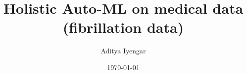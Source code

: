     \title{Holistic Auto-ML on medical data (fibrillation data) }

    \author{Aditya Iyengar}

    \date{\today}

    \newcommand{\examinerA}{Prof. Dr. Andreas Dengel}
    \newcommand{\examinerB}{Dr. Jens Krüger}

    \newcommand{\thesisType}{Master }